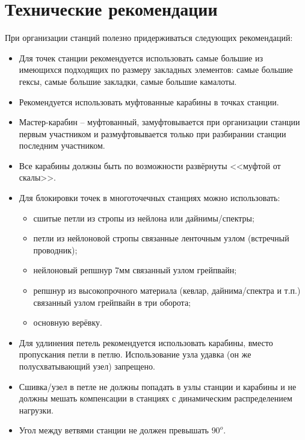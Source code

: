 \documentclass[fleqn, 12pt]{extarticle}
\begin{document}
\section{Технические рекомендации}\label{sec:advice}
    При организации станций полезно придерживаться следующих рекомендаций:
    \begin{itemize}
        \item Для точек станции рекомендуется использовать самые большие из имеющихся подходящих по размеру закладных элементов:
              самые большие гексы, самые большие закладки, самые большие камалоты.
        \item Рекомендуется использовать муфтованные карабины в точках станции.
        \item Мастер-карабин -- муфтованный, замуфтовывается при организации станции первым участником и размуфтовывается только при разбирании станции последним участником.
        \item Все карабины должны быть по возможности развёрнуты <<муфтой от скалы>>.
        \item Для блокировки точек в многоточечных станциях можно использовать:
            \begin{itemize}
                \item сшитые петли из стропы из нейлона или дайнимы/спектры;
                \item петли из нейлоновой стропы связанные ленточным узлом (встречный проводник);
                \item нейлоновый репшнур 7мм связанный узлом грейпвайн;
                \item репшнур из высокопрочного материала (кевлар, дайнима/спектра и т.п.) связанный узлом грейпвайн в три оборота;
                \item основную верёвку.
            \end{itemize}
        \item Для удлинения петель рекомендуется использовать карабины, вместо пропускания петли в петлю. Использование узла удавка (он же полусхватывающий узел) запрещено.
        \item Сшивка/узел в петле не должны попадать в узлы станции и карабины и не должны мешать компенсации в станциях с динамическим распределением нагрузки.
        \item Угол между ветвями станции не должен превышать $90^o$.
    \end{itemize}
    
\nocite{*}


\end{document}
